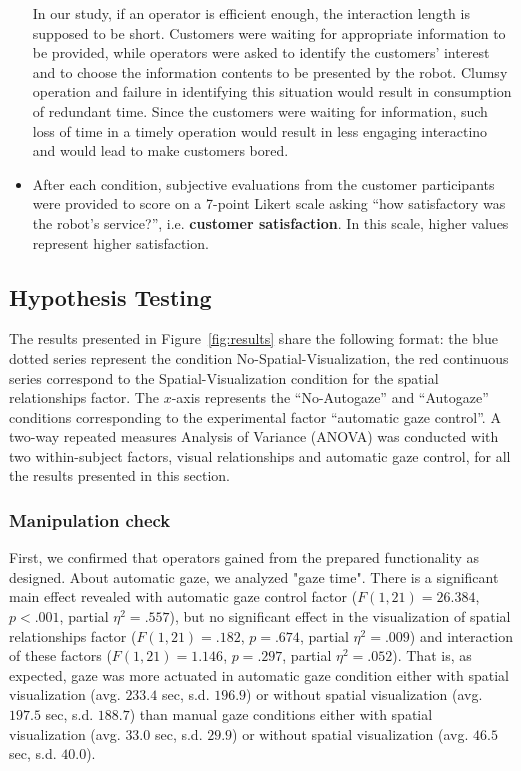 \documentclass[journal]{IEEEtran}
\begin{document}
\begin{itemize}
  In our study, if an operator is efficient enough, the interaction length is supposed to be short.
  Customers were waiting for appropriate information to be provided, while operators were asked to identify the customers' interest and to choose the information contents to be presented by the robot.
  Clumsy operation and failure in identifying this situation would result in consumption of redundant time. 
  Since the customers were waiting for information, such loss of time in a timely operation would result in less engaging interactino and would lead to make customers bored.
  \item After each condition, subjective evaluations from the customer participants were provided to score on a 7-point Likert scale asking ``how satisfactory was the robot's service?'', i.e. {\bf customer satisfaction}. 
  In this scale, higher values represent higher satisfaction.
\end{itemize} 

\subsection{Hypothesis Testing}
\label{subsubsec:verification}
The results presented in Figure~\ref{fig:results} share the following format: the blue dotted series represent the condition No-Spatial-Visualization, the red continuous series correspond to the Spatial-Visualization condition for the spatial relationships factor.
The $x$-axis represents the ``No-Autogaze'' and ``Autogaze'' conditions corresponding to the experimental factor ``automatic gaze control''.
A two-way repeated measures Analysis of Variance (ANOVA) was conducted with two within-subject factors, visual relationships and automatic gaze control, for all the results presented in this section.

\subsubsection{Manipulation check}
First, we confirmed that operators gained from the prepared functionality as designed. 
About automatic gaze, we analyzed "gaze time". 
There is a significant main effect revealed with automatic gaze control factor ($F(1,21)=26.384$, $p<.001$, partial $\eta^2 = .557$), but no significant effect in the visualization of spatial relationships factor ($F(1,21)=.182$, $p=.674$, partial $\eta^2 = .009$) and interaction of these factors ($F(1,21)=1.146$, $p=.297$, partial $\eta^2 = .052$).
That is, as expected, gaze was more actuated in automatic gaze condition either with spatial visualization (avg. $233.4$ sec, s.d. $196.9$) or without spatial visualization (avg. $197.5$ sec, s.d. $188.7$) than manual gaze conditions either with spatial visualization (avg. $33.0$ sec, s.d. $29.9$) or without spatial visualization (avg. $46.5$ sec, s.d. $40.0$). 
\end{document}
